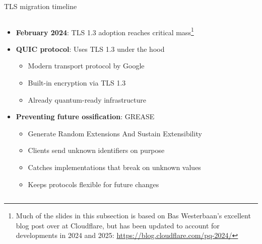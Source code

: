 \documentclass[aspectratio=169, lualatex, handout]{beamer}
\begin{document}
\begin{frame}{TLS migration timeline}
	\begin{columns}[c]
		\begin{column}{1\textwidth}
			\begin{itemize}
				\item \textbf{February 2024}: TLS 1.3 adoption reaches critical mass\footnote{Much of the slides in this subsection is based on Bas Westerbaan's excellent blog post over at Cloudflare, but has been updated to account for developments in 2024 and 2025: \url{https://blog.cloudflare.com/pq-2024/}}
				\item \textbf{QUIC protocol}: Uses TLS 1.3 under the hood
				      \begin{itemize}
					      \item Modern transport protocol by Google
					      \item Built-in encryption via TLS 1.3
					      \item Already quantum-ready infrastructure
				      \end{itemize}
				\item \textbf{Preventing future ossification}: GREASE
				      \begin{itemize}
					      \item Generate Random Extensions And Sustain Extensibility
					      \item Clients send unknown identifiers on purpose
					      \item Catches implementations that break on unknown values
					      \item Keeps protocols flexible for future changes
				      \end{itemize}
			\end{itemize}
		\end{column}
	\end{columns}
\end{frame}
\end{document}
